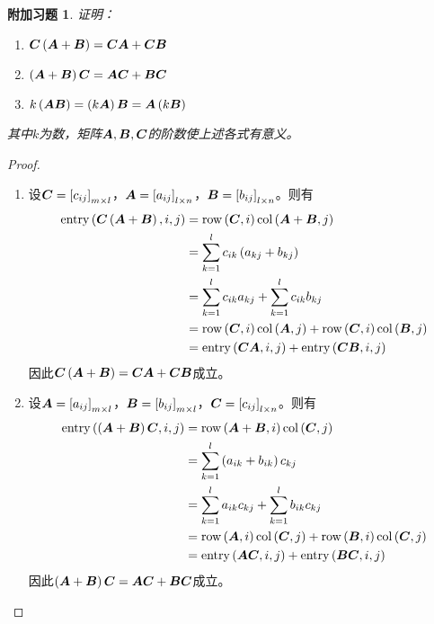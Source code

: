 \documentclass{ctexart}
\newtheorem{extraprob}{附加习题}[section]
\begin{document}
\begin{extraprob}
    证明：
    \begin{enumerate}
        \item \(\boldsymbol{C}\left( \boldsymbol{A}+\boldsymbol{B} \right)=\boldsymbol{C}\boldsymbol{A}+\boldsymbol{C}\boldsymbol{B}\)
        \item \(\left( \boldsymbol{A}+\boldsymbol{B} \right)\boldsymbol{C}=\boldsymbol{A}\boldsymbol{C}+\boldsymbol{B}\boldsymbol{C}\)
        \item \(k\left( \boldsymbol{A}\boldsymbol{B} \right)=\left( k\boldsymbol{A} \right)\boldsymbol{B}=\boldsymbol{A}\left( k\boldsymbol{B} \right)\)
    \end{enumerate}
    其中\(k\)为数，矩阵\(\boldsymbol{A},\boldsymbol{B},\boldsymbol{C}\)的阶数使上述各式有意义。
\end{extraprob}
\begin{proof}
    \begin{enumerate}
        \item
              {
              设\(\boldsymbol{C}=\left[ c_{ij} \right]_{m\times l}\)，\(\boldsymbol{A}=\left[ a_{ij} \right]_{l\times n}\)，\(\boldsymbol{B}=\left[ b_{ij} \right]_{l\times n}\)。则有
              \begin{align*}
                  \mathrm{entry}\left( \boldsymbol{C}\left( \boldsymbol{A}+\boldsymbol{B} \right),i,j \right) & =\mathrm{row}\left( \boldsymbol{C},i \right)\mathrm{col}\left( \boldsymbol{A}+\boldsymbol{B},j \right)                        \\
                                                         & =\sum_{k=1}^lc_{ik}\left( a_{kj}+b_{kj} \right)                   \\
                                                         & =\sum_{k=1}^lc_{ik}a_{kj}+\sum_{k=1}^lc_{ik}b_{kj}         \\
                                                         & =\mathrm{row}\left( \boldsymbol{C},i \right)\mathrm{col}\left( \boldsymbol{A},j \right)+\mathrm{row}\left( \boldsymbol{C},i \right)\mathrm{col}\left( \boldsymbol{B},j \right) \\
                                                         & =\mathrm{entry}\left( \boldsymbol{C}\boldsymbol{A},i,j \right)+\mathrm{entry}\left( \boldsymbol{C}\boldsymbol{B},i,j \right)
              \end{align*}
              因此\(\boldsymbol{C}\left( \boldsymbol{A}+\boldsymbol{B} \right)=\boldsymbol{C}\boldsymbol{A}+\boldsymbol{C}\boldsymbol{B}\)成立。
              }

        \item
              {
              设\(\boldsymbol{A}=\left[ a_{ij} \right]_{m\times l}\)，\(\boldsymbol{B}=\left[ b_{ij} \right]_{m\times l}\)，\(\boldsymbol{C}=\left[ c_{ij} \right]_{l\times n}\)。则有
              \begin{align*}
                  \mathrm{entry}\left( \left( \boldsymbol{A}+\boldsymbol{B} \right)\boldsymbol{C},i,j \right) & =\mathrm{row}\left( \boldsymbol{A}+\boldsymbol{B},i \right)\mathrm{col}\left( \boldsymbol{C},j \right)                        \\
                                                         & =\sum_{k=1}^l\left( a_{ik}+b_{ik} \right)c_{kj}                   \\
                                                         & =\sum_{k=1}^la_{ik}c_{kj}+\sum_{k=1}^lb_{ik}c_{kj}         \\
                                                         & =\mathrm{row}\left( \boldsymbol{A},i \right)\mathrm{col}\left( \boldsymbol{C},j \right)+\mathrm{row}\left( \boldsymbol{B},i \right)\mathrm{col}\left( \boldsymbol{C},j \right) \\
                                                         & =\mathrm{entry}\left( \boldsymbol{A}\boldsymbol{C},i,j \right)+\mathrm{entry}\left( \boldsymbol{B}\boldsymbol{C},i,j \right)
              \end{align*}
              因此\(\left( \boldsymbol{A}+\boldsymbol{B} \right)\boldsymbol{C}=\boldsymbol{A}\boldsymbol{C}+\boldsymbol{B}\boldsymbol{C}\)成立。
              }


\end{enumerate}
\end{proof}
\end{document}
